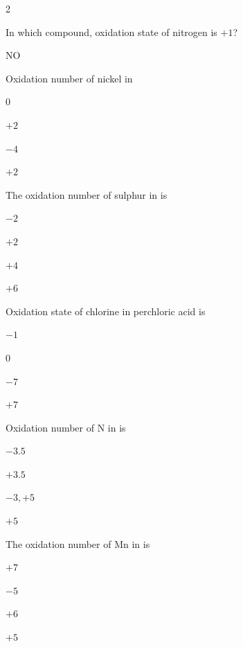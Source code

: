 \documentclass[10pt,a4paper]{article}
\begin{document}
\begin{multicols}{2}
\begin{questions}[start=1]
\item In which compound, oxidation state of nitrogen is $+1$?
\begin{options}
  \item NO
  \item {}
  \item {}
  \item {}
\end{options}

\item Oxidation number of nickel in 
\begin{options}
  \item 0
  \item $+2$
  \item $-4$
  \item $+2$
\end{options}

\item The oxidation number of sulphur in  is
\begin{options}
  \item $-2$
  \item $+2$
  \item $+4$
  \item $+6$
\end{options}

\item Oxidation state of chlorine in perchloric acid is
\begin{options}
  \item $-1$
  \item 0
  \item $-7$
  \item $+7$
\end{options}

\item Oxidation number of N in  is
\begin{options}
  \item $-3.5$
  \item $+3.5$
  \item $-3, +5$
  \item $+5$
\end{options}

\item The oxidation number of Mn in  is
\begin{options}
  \item $+7$
  \item $-5$
  \item $+6$
  \item $+5$
\end{options}


\end{questions}
\end{multicols}
\end{document}
